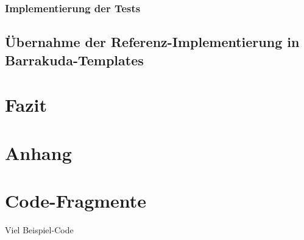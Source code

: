\documentclass[12pt,a4paper,bibliography=totocnumbered,listof=totocnumbered]{scrartcl}
\begin{document}
\subsubsection{Implementierung der Tests}

\subsection{Übernahme der Referenz-Implementierung in Barrakuda-Templates}

\section{Fazit}

\renewcommand\refname{Quellenverzeichnis}


\pagebreak

\setcounter{page}{1}

\begin{appendix}
\section*{Anhang}
{}

\section{Code-Fragmente}
Viel Beispiel-Code

\end{appendix}
\end{document}
